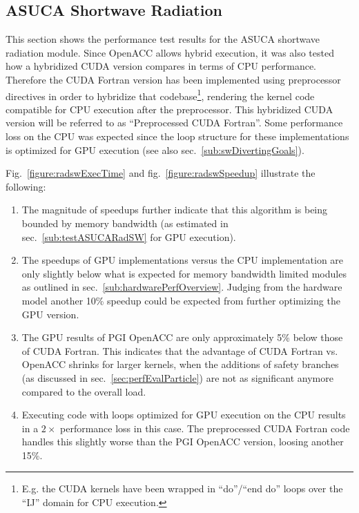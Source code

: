 \clearpage
\subsection{ASUCA Shortwave Radiation} \label{perfEvalShortwave}

This section shows the performance test results for the ASUCA shortwave radiation module. Since OpenACC allows hybrid execution, it was also tested how a hybridized CUDA version compares in terms of CPU performance. Therefore the CUDA Fortran version has been implemented using preprocessor directives in order to hybridize that codebase\footnote{E.g. the CUDA kernels have been wrapped in ``do''/``end do'' loops over the ``IJ'' domain for CPU execution.}, rendering the kernel code compatible for CPU execution after the preprocessor.  This hybridized CUDA version will be referred to as \textquotedblleft Preprocessed CUDA Fortran\textquotedblright. Some performance loss on the CPU was expected since the loop structure for these implementations is optimized for GPU execution (see also sec.~\ref{sub:swDivertingGoals}).

Fig.~\ref{figure:radswExecTime} and fig.~\ref{figure:radswSpeedup} illustrate the following: 

\begin{enumerate}
 \item The magnitude of speedups further indicate that this algorithm is being bounded by memory bandwidth (as estimated in sec.~\ref{sub:testASUCARadSW} for GPU execution).
 \item The speedups of GPU implementations versus the CPU implementation are only slightly below what is expected for memory bandwidth limited modules as outlined in sec.~\ref{sub:hardwarePerfOverview}. Judging from the hardware model another 10\% speedup could be expected from further optimizing the GPU version.
 \item The GPU results of PGI OpenACC are only approximately 5\% below those of CUDA Fortran. This indicates that the advantage of CUDA Fortran vs. OpenACC shrinks for larger kernels, when the additions of safety branches (as discussed in sec.~\ref{sec:perfEvalParticle}) are not as significant anymore compared to the overall load.
 \item Executing code with loops optimized for GPU execution on the CPU results in a $2\times$ performance loss in this case. The preprocessed CUDA Fortran code handles this slightly worse than the PGI OpenACC version, loosing another 15\%.
\end{enumerate}

